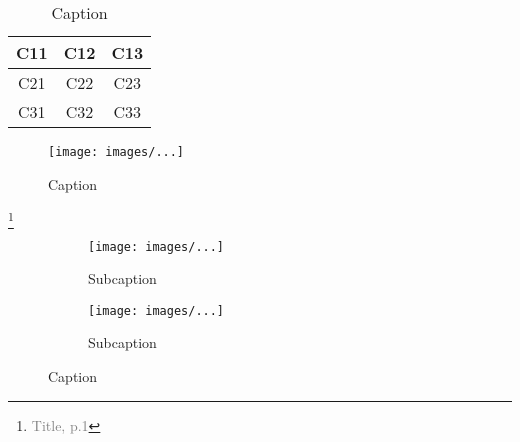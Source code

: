 \begin{table}[!h]
\centering
\begin{tabular}{ c|c|c }
C11 & C12 & C13 \\
\hline
C21 & C22 & C23 \\
\hline
C31 & C32 & C33
\end{tabular}
\caption{Caption}
\label{table:idFIG}
\end{table}

\begin{figure}[h]
    \centering
    \texttt{[image: images/...]}
    \caption{Caption}
    \label{fig:idFIG}
\end{figure}

\footnote{\textcolor{gray}{Title, p.1\cite{idREF}}}

\begin{figure}[h]
    \centering
        \begin{subfigure}[b]{0.4\textwidth}
            \centering
            \texttt{[image: images/...]}
            \caption{Subcaption}
            \label{fig:idFIG}
        \end{subfigure}
        \begin{subfigure}[b]{0.4\textwidth}
            \centering
            \texttt{[image: images/...]}
            \caption{Subcaption}
            \label{fig:idFIG}
        \end{subfigure}
        \caption{Caption}
        \label{fig:idFIG}
\end{figure}